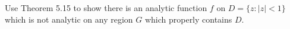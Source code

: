 
Use Theorem 5.15 to show there is an analytic function $f$ on $D = \{z : |z| < 1\}$ which is not analytic on any region $G$ which properly contains $D$.
